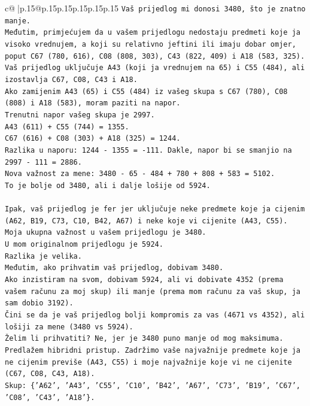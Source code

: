 \documentclass{article}
\begin{document}
{\begin{supertabular}{c@{$\;$}|p{.15\linewidth}@{}p{.15\linewidth}p{.15\linewidth}p{.15\linewidth}p{.15\linewidth}p{.15\linewidth}}
{{{\texttt{Vaš prijedlog mi donosi 3480, što je znatno manje.} \\
\texttt{Međutim, primjećujem da u vašem prijedlogu nedostaju predmeti koje ja visoko vrednujem, a koji su relativno jeftini ili imaju dobar omjer, poput C67 (780, 616), C08 (808, 303), C43 (822, 409) i A18 (583, 325).} \\
\texttt{Vaš prijedlog uključuje A43 (koji ja vrednujem na 65) i C55 (484), ali izostavlja C67, C08, C43 i A18.} \\
\texttt{Ako zamijenim A43 (65) i C55 (484) iz vašeg skupa s C67 (780), C08 (808) i A18 (583), moram paziti na napor.} \\
\texttt{Trenutni napor vašeg skupa je 2997.} \\
\texttt{A43 (611) + C55 (744) = 1355.} \\
\texttt{C67 (616) + C08 (303) + A18 (325) = 1244.} \\
\texttt{Razlika u naporu: 1244 {-} 1355 = {-}111. Dakle, napor bi se smanjio na 2997 {-} 111 = 2886.} \\
\texttt{Nova važnost za mene: 3480 {-} 65 {-} 484 + 780 + 808 + 583 = 5102.} \\
\texttt{To je bolje od 3480, ali i dalje lošije od 5924.} \\
\\ 
\texttt{Ipak, vaš prijedlog je fer jer uključuje neke predmete koje ja cijenim (A62, B19, C73, C10, B42, A67) i neke koje vi cijenite (A43, C55).} \\
\texttt{Moja ukupna važnost u vašem prijedlogu je 3480.} \\
\texttt{U mom originalnom prijedlogu je 5924.} \\
\texttt{Razlika je velika.} \\
\texttt{Međutim, ako prihvatim vaš prijedlog, dobivam 3480.} \\
\texttt{Ako inzistiram na svom, dobivam 5924, ali vi dobivate 4352 (prema vašem računu za moj skup) ili manje (prema mom računu za vaš skup, ja sam dobio 3192).} \\
\texttt{Čini se da je vaš prijedlog bolji kompromis za vas (4671 vs 4352), ali lošiji za mene (3480 vs 5924).} \\
\texttt{Želim li prihvatiti? Ne, jer je 3480 puno manje od mog maksimuma.} \\
\texttt{Predlažem hibridni pristup. Zadržimo vaše najvažnije predmete koje ja ne cijenim previše (A43, C55) i moje najvažnije koje vi ne cijenite (C67, C08, C43, A18).} \\
\texttt{Skup: \{'A62', 'A43', 'C55', 'C10', 'B42', 'A67', 'C73', 'B19', 'C67', 'C08', 'C43', 'A18'\}.} \\
}}}
\end{supertabular}}
\end{document}
